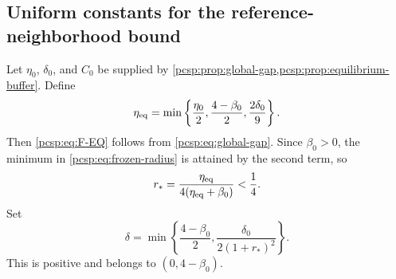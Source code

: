 \documentclass[11pt,reqno]{amsart}
\numberwithin{equation}{section}
\theoremstyle{plain}
\theoremstyle{definition}
\newcommand{\be}{\beta}
\begin{document}
\subsection{Uniform constants for the reference-neighborhood bound}

Let $\eta_0$, $\delta_0$, and $C_0$ be supplied by \cref{pcsp:prop:global-gap,pcsp:prop:equilibrium-buffer}.  Define
\begin{equation}\label{pcsp:eq:eta-choice}
 \eta_{\rm eq}
 =\min\left\{\frac{\eta_0}{2},
               \frac{4-\be_0}{2},
               \frac{2\delta_0}{9}\right\}.
\end{equation}
Then \eqref{pcsp:eq:F-EQ} follows from \eqref{pcsp:eq:global-gap}.  Since $\be_0>0$, the minimum in \eqref{pcsp:eq:frozen-radius} is attained by the second term, so
\begin{equation}\label{pcsp:eq:r-explicit}
 r_*=\frac{\eta_{\rm eq}}{4(\eta_{\rm eq}+\be_0)}<\frac14.
\end{equation}
Set
\begin{equation}\label{pcsp:eq:delta-choice}
 \delta
 =\min\left\{\frac{4-\be_0}{2},
 \frac{\delta_0}{2(1+r_*)^2}\right\}.
\end{equation}
This is positive and belongs to $(0,4-\be_0)$.
\end{document}
